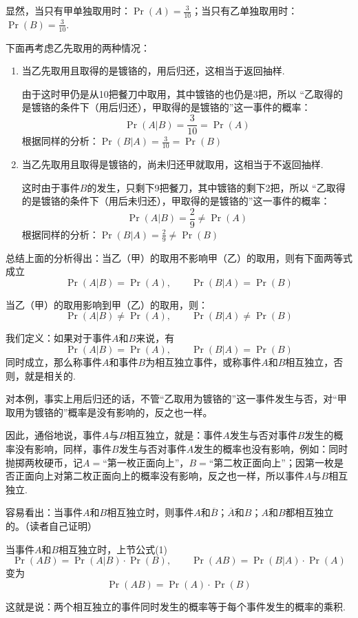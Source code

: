显然，当只有甲单独取用时：$\Pr(A)=\frac{3}{10}$；当只有乙单独取用时：$\Pr(B)=\frac{3}{10}$.

下面再考虑乙先取用的两种情况：
\begin{enumerate}[(1)]
\item 当乙先取用且取得的是镀铬的，用后归还，这相当于返回抽样.

由于这时甲仍是从10把餐刀中取用，其中镀铬的也仍是3把，所以
“乙取得的是镀铬的条件下（用后归还），甲取得的是镀铬的”这一事件的概率：
\[\Pr(A|B)=\frac{3}{10}=\Pr(A)\]
根据同样的分析：$\Pr(B|A)=\frac{3}{10}=\Pr(B)$
\item 当乙先取用且取得是镀铬的，尚未归还甲就取用，这相当于不返回抽样.

这时由于事件$B$的发生，只剩下9把餐刀，其中镀铬的剩下2把，所以
“乙取得的是镀铬的条件下（用后未归还），甲取得的是镀铬的”这一事件的概率：
\[\Pr(A|B)=\frac{2}{9}\ne \Pr(A)\]
根据同样的分析：$\Pr(B|A)=\frac{2}{9}\ne \Pr(B)$
\end{enumerate}

总结上面的分析得出：当乙（甲）的取用不影响甲（乙）的取用，则有下面两等式成立
\[\Pr(A|B)=\Pr(A),\qquad \Pr(B|A)=\Pr(B)\]

当乙（甲）的取用影响到甲（乙）的取用，则：
\[\Pr(A|B)\ne \Pr(A),\qquad \Pr(B|A)\ne \Pr(B)\]

我们定义：如果对于事件$A$和$B$来说，有
\[\Pr(A|B)= \Pr(A),\qquad \Pr(B|A)= \Pr(B)\]
同时成立，那么称事件$A$和事件$B$为相互独立事件，或称事件$A$和$B$相互独立，否则，就是相关的.

对本例，事实上用后归还的话，不管“乙取用为镀铬的”这一事件发生与否，对“甲取用为镀铬的”概率是没有影响的，反之也一样。

因此，通俗地说，事件$A$与$B$相互独立，就是：事件$A$发生与否对事件$B$发生的概率没有影响，同样，事件$B$发生与否对事件$A$发生的概率也没有影响，例如：同时抛掷两枚硬币，记$A=$“第一枚正面向上”，$B=$“第二枚正面向上”；因第一枚是否正面向上对第二枚正面向上的概率没有影响，反之也一样，所以事件$A$与$B$相互独立.

容易看出：当事件$A$和$B$相互独立时，则事件$A$和$\overline{B}$；$\overline{A}$和$B$；$A$和$B$都相互独立的。（读者自己证明）

当事件$A$和$B$相互独立时，上节公式(1)
\[\Pr(AB)=\Pr(A|B)\cdot \Pr(B),\qquad \Pr(AB)=\Pr(B|A)\cdot \Pr(A)\]
变为
\begin{equation}
    \Pr(AB)=\Pr(A)\cdot \Pr(B) \tag{3}
\end{equation}

这就是说：两个相互独立的事件同时发生的概率等于每个事件发生的概率的乘积.

